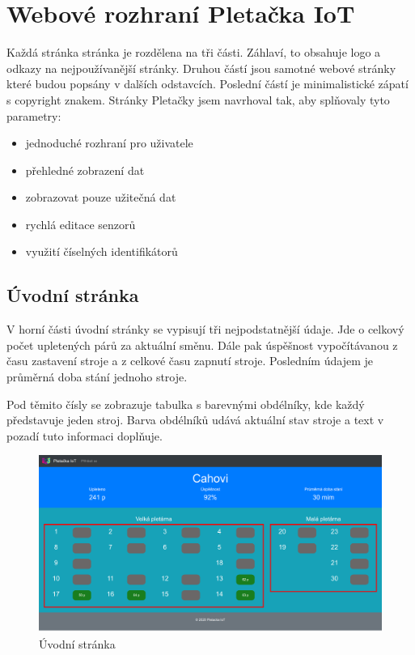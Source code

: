 \section{Webové rozhraní Pletačka IoT}
Každá stránka stránka je rozdělena na tři části. Záhlaví, to obsahuje logo a odkazy na nejpoužívanější stránky.
Druhou částí jsou samotné webové stránky které budou popsány v dalších odstavcích.
Poslední částí je minimalistické zápatí s copyright znakem.\newline
Stránky Pletačky jsem navrhoval tak, aby splňovaly tyto parametry:

\fxnote[author=JA]{\textcolor{mygreen}{Doplnit obrázky stránek pod kapitolu nebo jeden list s fotkami}}

\begin{itemize}
    \item jednoduché rozhraní pro uživatele
    \item přehledné zobrazení dat
    \item zobrazovat pouze užitečná dat
    \item rychlá editace senzorů
    \item využití číselných identifikátorů
\end{itemize}


\subsection{Úvodní stránka}
V horní části úvodní stránky se vypisují tři nejpodstatnější údaje.
Jde o celkový počet upletených párů za aktuální směnu.
Dále pak úspěšnost vypočítávanou z času zastavení stroje a z celkové času zapnutí stroje.
Posledním údajem je průměrná doba stání jednoho stroje.   

Pod těmito čísly se zobrazuje tabulka s barevnými obdélníky, kde každý představuje jeden stroj.
Barva obdélníků udává aktuální stav stroje a text v pozadí tuto informaci doplňuje. 

\begin{figure}[htbp]
    \centering
    \includegraphics[width=\textwidth]{img/Home.png}
    \caption{Úvodní stránka}
    \label{fig:databaze}
\end{figure}


